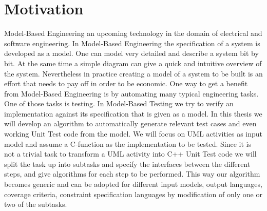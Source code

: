 \chapter{Motivation}
Model-Based Engineering an upcoming technology in the domain of electrical and software engineering. In Model-Based Engineering the specification of a system is developed as a model.
One can model very detailed and describe a system bit by bit. At the same time a simple diagram can give a quick and intuitive overview of the system. 
Nevertheless in practice creating a model of a system to be built is an effort that needs to pay off in order to be economic. 
One way to get a benefit from Model-Based Engineering is by automating many typical engineering tasks. One of those tasks is testing. In Model-Based Testing we try to verify an implementation against its specification that is given as a model. In this thesis we will develop an algorithm to automatically generate relevant test cases and even working Unit Test code from the model. We will focus on UML activities as input model and assume a C-function as the implementation to be tested. Since it is not a trivial task to transform a UML activity into C++ Unit Test code we will split the task up into subtasks and specify the interfaces between the different steps, and give algorithms for each step to be performed. This way our algorithm becomes generic and can be adopted for different input models, output languages, coverage criteria, constraint specification languages by modification of only one or two of the subtasks.
